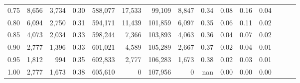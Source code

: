 \begin{tabular}{rrrrrrrrrrrrrrr}
0.75 &   8,656 &   3,734 &  0.30 &  588,077 &   17,533 &   99,109 &    8,847 &  0.34 &  0.08 &  0.16 &      0.04 \\
0.80 &   6,094 &   2,750 &  0.31 &  594,171 &   11,439 &  101,859 &    6,097 &  0.35 &  0.06 &  0.11 &      0.02 \\
0.85 &   4,073 &   2,034 &  0.33 &  598,244 &    7,366 &  103,893 &    4,063 &  0.36 &  0.04 &  0.07 &      0.02 \\
0.90 &   2,777 &   1,396 &  0.33 &  601,021 &    4,589 &  105,289 &    2,667 &  0.37 &  0.02 &  0.04 &      0.01 \\
0.95 &   1,812 &     994 &  0.35 &  602,833 &    2,777 &  106,283 &    1,673 &  0.38 &  0.02 &  0.03 &      0.01 \\
1.00 &   2,777 &   1,673 &  0.38 &  605,610 &        0 &  107,956 &        0 &   nan &  0.00 &  0.00 &      0.00 \\
\bottomrule
\end{tabular}
